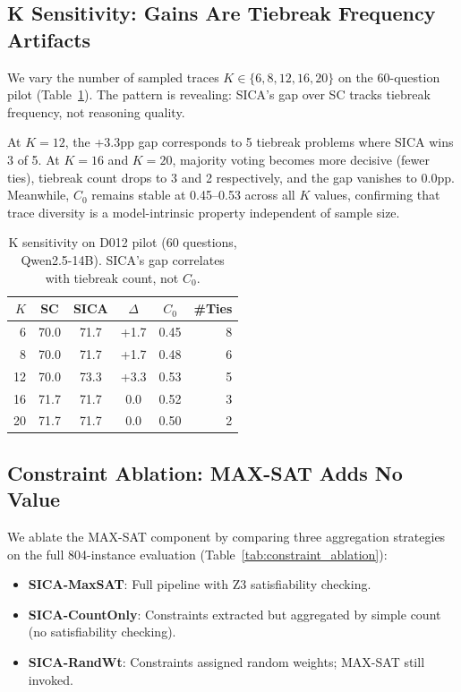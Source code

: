 \documentclass[11pt,a4paper]{article}
\begin{document}
\subsection{K Sensitivity: Gains Are Tiebreak Frequency Artifacts}
\label{sec:k_sensitivity}

We vary the number of sampled traces $K \in \{6, 8, 12, 16, 20\}$ on the 60-question pilot (Table~\ref{tab:k_sensitivity}).
The pattern is revealing: SICA's gap over SC tracks tiebreak frequency, not reasoning quality.

At $K=12$, the +3.3pp gap corresponds to 5 tiebreak problems where SICA wins 3 of 5.
At $K=16$ and $K=20$, majority voting becomes more decisive (fewer ties), tiebreak count drops to 3 and 2 respectively, and the gap vanishes to 0.0pp.
Meanwhile, $C_0$ remains stable at 0.45--0.53 across all $K$ values, confirming that trace diversity is a model-intrinsic property independent of sample size.

\begin{table}[t]
\centering
\small
\begin{tabular}{rccccr}
\toprule
$K$ & \textbf{SC} & \textbf{SICA} & \textbf{$\Delta$} & $C_0$ & \textbf{\#Ties} \\
\midrule
6 & 70.0 & 71.7 & +1.7 & 0.45 & 8 \\
8 & 70.0 & 71.7 & +1.7 & 0.48 & 6 \\
12 & 70.0 & 73.3 & +3.3 & 0.53 & 5 \\
16 & 71.7 & 71.7 & 0.0 & 0.52 & 3 \\
20 & 71.7 & 71.7 & 0.0 & 0.50 & 2 \\
\bottomrule
\end{tabular}
\caption{K sensitivity on D012 pilot (60 questions, Qwen2.5-14B). SICA's gap correlates with tiebreak count, not $C_0$.}
\label{tab:k_sensitivity}
\end{table}

\subsection{Constraint Ablation: MAX-SAT Adds No Value}
\label{sec:constraint_ablation}

We ablate the MAX-SAT component by comparing three aggregation strategies on the full 804-instance evaluation (Table~\ref{tab:constraint_ablation}):

\begin{itemize}
\item \textbf{SICA-MaxSAT}: Full pipeline with Z3 satisfiability checking.
\item \textbf{SICA-CountOnly}: Constraints extracted but aggregated by simple count (no satisfiability checking).
\item \textbf{SICA-RandWt}: Constraints assigned random weights; MAX-SAT still invoked.
\end{itemize}
\end{document}
